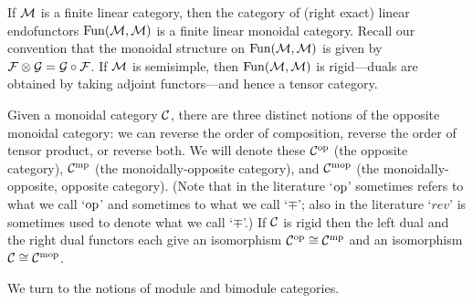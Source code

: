 \documentclass{amsart}
\begin{document}

\begin{example}
	If $\mathcal M$ is a finite linear category, then the category of (right exact) linear endofunctors $\operatorname{Fun}(\mathcal M, \mathcal M)$ is a finite linear monoidal category. Recall our convention that the monoidal structure on $\operatorname{Fun}(\mathcal M, \mathcal M)$ is given by $\mathcal F \otimes \mathcal G = \mathcal G \circ \mathcal F$. If $\mathcal M$ is semisimple, then $\operatorname{Fun}(\mathcal M, \mathcal M)$ is rigid---duals are obtained by taking adjoint functors---and hence a tensor category.  
\end{example} %

Given a monoidal category $\mathcal C$, there are three distinct notions of the opposite monoidal category: we can reverse the order of composition, reverse the order of tensor product, or reverse both.  We will denote these $\mathcal C^{\mathrm{op}}$ (the opposite category), $\mathcal C^{\mathrm{mp}}$ (the monoidally-opposite category), and $\mathcal C^{\mathrm{mop}}$ (the monoidally-opposite, opposite category).  (Note that in the literature `$\mathrm{op}$' sometimes refers to what we call `$\mathrm{op}$' and sometimes to what we call `$\mp$'; also in the literature `$rev$' is sometimes used to denote what we call `$\mp$'.)  If $\mathcal C$ is rigid then the left dual and the right dual functors each give an isomorphism $\mathcal C^{\mathrm{op}} \cong \mathcal C^{\mathrm{mp}}$ and an isomorphism $\mathcal C \cong \mathcal C^{\mathrm{mop}}$.  

We turn to the notions of module and bimodule categories.
\end{document}
